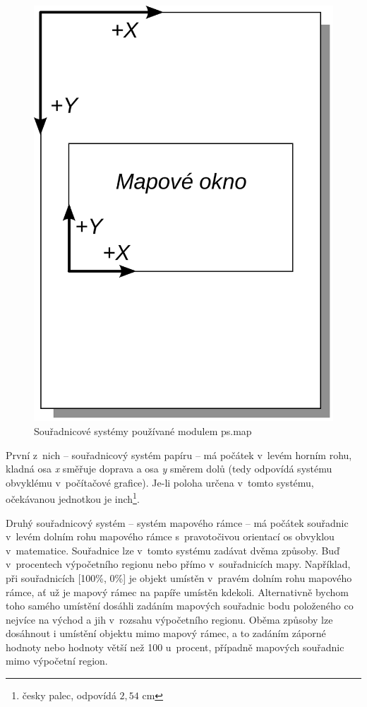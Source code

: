 \documentclass[a4paper,12pt,draft]{article}
\begin{document}
\begin{figure}[h!]
    \centering
    \includegraphics[width=0.2\textheight]{sour_systemy.pdf}
    \caption{Souřadnicové systémy používané modulem
    ps.map\label{fig:sour_systemy}}
\end{figure}


První z~nich -- souřadnicový systém papíru -- má počátek v~levém
horním rohu, kladná osa \emph{x} směřuje doprava a osa \emph{y} směrem
dolů (tedy odpovídá systému obvyklému v~počítačové grafice).
Je-li poloha určena v~tomto systému, očekávanou jednotkou je inch\footnote{
česky palec, odpovídá $2{,}54$ cm}.

Druhý souřadnicový systém -- systém mapového rámce -- má počátek souřadnic
v~levém dolním rohu mapového rámce s~pravotočivou orientací os obvyklou
v~matematice. Souřad\-nice lze v~tomto systému zadávat dvěma způsoby. Buď
v~procentech výpočetního regionu nebo přímo v~souřadnicích
mapy. Například, při souřadnicích [100\%, 0\%] je objekt umístěn
v~pravém dolním rohu mapového rámce, ať už je mapový rámec na papíře
umístěn kdekoli. Alternativně bychom toho samého umístění dosáhli
zadáním mapových souřadnic bodu položeného co nejvíce na východ
a jih v~rozsahu výpočet\-ního regionu. Oběma způsoby lze dosáhnout i
umístění objektu mimo mapový rámec, a to zadáním záporné hodnoty
nebo hodnoty větší než 100 u~procent, případně mapových souřadnic
mimo výpočetní region.
\end{document}
